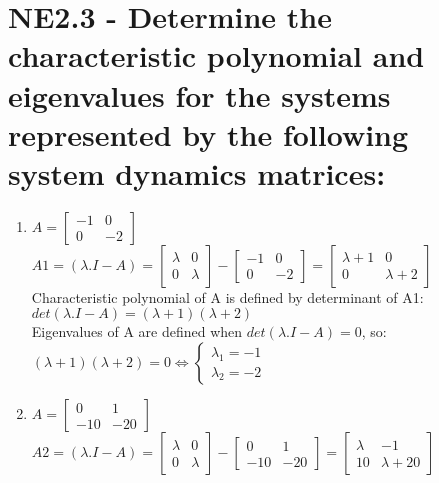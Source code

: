 \documentclass[14pt,a4paper]{article}
\begin{document}
\section{NE2.3 - Determine the characteristic polynomial and eigenvalues for the systems represented by the following system dynamics matrices:}
\begin{enumerate}
	\doublespacing
	\item 
	$A = \begin{bmatrix}-1&0 \\ 0&-2 \end{bmatrix} $ \\
	$A1 = (\lambda .I-A) = \begin{bmatrix} \lambda & 0 \\ 0 & \lambda \end{bmatrix} - \begin{bmatrix} -1&0 \\ 0&-2 \end{bmatrix} = \begin{bmatrix} \lambda + 1 & 0 \\ 0 & \lambda +2 \end{bmatrix} $ \\
	
	Characteristic polynomial of A is defined by determinant of A1:\\
	$det(\lambda .I-A) = (\lambda + 1)(\lambda +2)$ \\
	Eigenvalues of A are defined when $ det(\lambda .I-A) = 0$, so: \\
	$(\lambda + 1)(\lambda +2) = 0  \Leftrightarrow \begin{cases} \lambda_1 = -1 \\ \lambda_2 = -2 \end{cases} $ \\
	
	\item 
	$A = \begin{bmatrix} 0&1 \\ -10&-20 \end{bmatrix} $ \\
	$A2 = (\lambda .I-A) = \begin{bmatrix} \lambda & 0 \\ 0 & \lambda \end{bmatrix} - \begin{bmatrix} 0&1 \\ -10&-20 \end{bmatrix} = \begin{bmatrix} \lambda & -1 \\ 10 & \lambda +20 \end{bmatrix} $ \\
	

\end{enumerate}
\end{document}
